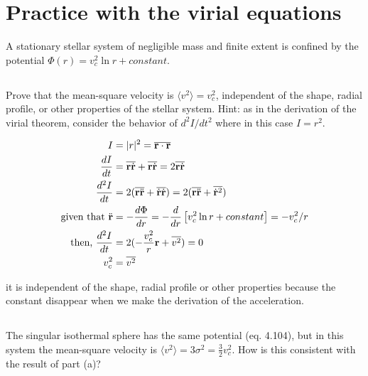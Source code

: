 \section{Practice with the virial equations}

A stationary stellar system of negligible mass and finite extent is confined by the
potential  $\Phi(r)=v_c^2\ln{r}+constant$.

\subsection{}
Prove that the mean-square velocity is $\langle v^2 \rangle = v_c^2$, independent of the shape, radial profile, or other properties of the stellar system. Hint: as in the derivation of the virial
theorem, consider the behavior of $d^2I/dt^2$ where in this case $I=r^2$.

\begin{align*}
    I &=|r|^2 = \overline{\mathbf{r}\cdot \mathbf{r}}\\
    \frac{dI}{dt}&= \overline{\mathbf{r}\Dot{\mathbf{r}}}+\overline{\mathbf{r}\Dot{\mathbf{r}}}=2\overline{\mathbf{r}\Dot{\mathbf{r}}}\\
    \frac{d^2I}{dt}&=2(\overline{\mathbf{r}\Ddot{\mathbf{r}}}+\overline{\Dot{\mathbf{r}}\Dot{\mathbf{r}}})=2(\overline{\mathbf{r}\Ddot{\mathbf{r}}}+\overline{\Dot{\mathbf{r}}^2})\\
    \text{given that }
    \Ddot{\mathbf{r}}&=-\frac{d\Phi}{dr}=-\frac{d}{dr}\left[v_c^2\ln{r}+constant \right]=-v_c^2/r\\
    \text{then, } \frac{d^2I}{dt}&=2(-\frac{v_c^2}{r}\mathbf{r}+\overline{v^2})=0\\
    v_c^2&=\overline{v^2}
\end{align*}

it is independent of the shape, radial profile or other properties because the constant disappear when we make the derivation of the acceleration.

\subsection{}
The singular isothermal sphere has the same potential (eq. 4.104), but in this system
the mean-square velocity is $\langle v^2\rangle = 3\sigma^2 = \frac{3}{2}v_c^2$. How is this consistent with the result of part (a)?
